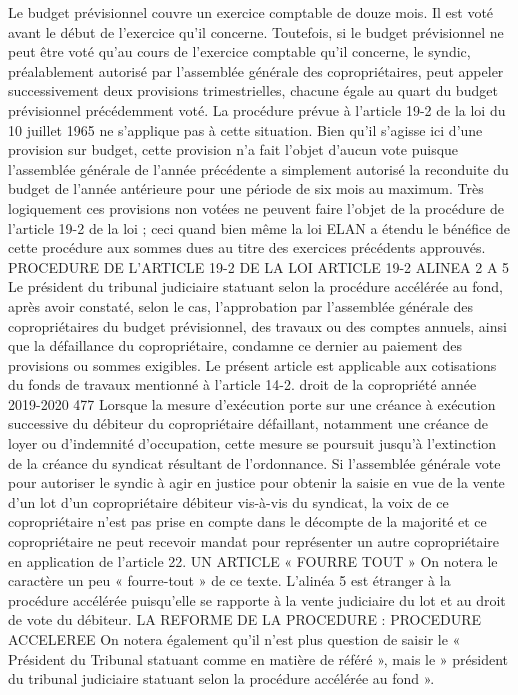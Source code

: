 Le budget prévisionnel couvre un exercice comptable de douze mois. Il est voté avant le début de l'exercice qu'il concerne.
Toutefois, si le budget prévisionnel ne peut être voté qu'au cours de l'exercice comptable qu'il concerne, le syndic, préalablement autorisé par l'assemblée générale des copropriétaires, peut appeler successivement deux provisions trimestrielles, chacune égale au quart du budget prévisionnel précédemment voté. La procédure prévue à l'article 19-2 de la loi du 10 juillet 1965 ne s'applique pas à cette situation.
Bien qu’il s’agisse ici d’une provision sur budget, cette provision n’a fait l’objet d’aucun vote puisque l’assemblée générale de l’année précédente a simplement autorisé la reconduite du budget de l’année antérieure pour une période de six mois au maximum. Très logiquement ces provisions non votées ne peuvent faire l’objet de la procédure de l’article 19-2 de la loi ; ceci quand bien même la loi ELAN a étendu le bénéfice de cette procédure aux sommes dues au titre des exercices précédents approuvés.
PROCEDURE DE L’ARTICLE 19-2 DE LA LOI
ARTICLE 19-2 ALINEA 2 A 5
Le président du tribunal judiciaire statuant selon la procédure accélérée au fond, après avoir constaté, selon le cas, l'approbation par l'assemblée générale des copropriétaires du budget prévisionnel, des travaux ou des comptes annuels, ainsi que la défaillance du copropriétaire, condamne ce dernier au paiement des provisions ou sommes exigibles.
Le présent article est applicable aux cotisations du fonds de travaux mentionné à l'article 14-2.
droit de la copropriété année 2019-2020
477
Lorsque la mesure d'exécution porte sur une créance à exécution successive du débiteur du copropriétaire défaillant, notamment une créance de loyer ou d'indemnité d'occupation, cette mesure se poursuit jusqu'à l'extinction de la créance du syndicat résultant de l'ordonnance.
Si l'assemblée générale vote pour autoriser le syndic à agir en justice pour obtenir la saisie en vue de la vente d'un lot d'un copropriétaire débiteur vis-à-vis du syndicat, la voix de ce copropriétaire n'est pas prise en compte dans le décompte de la majorité et ce copropriétaire ne peut recevoir mandat pour représenter un autre copropriétaire en application de l'article 22.
UN ARTICLE « FOURRE TOUT »
On notera le caractère un peu « fourre-tout » de ce texte.
L’alinéa 5 est étranger à la procédure accélérée puisqu’elle se rapporte à la vente judiciaire du lot et au droit de vote du débiteur.
LA REFORME DE LA PROCEDURE : PROCEDURE ACCELEREE
On notera également qu’il n’est plus question de saisir le « Président du Tribunal statuant comme en matière de référé », mais le » président du tribunal judiciaire statuant selon la procédure accélérée au fond ».
